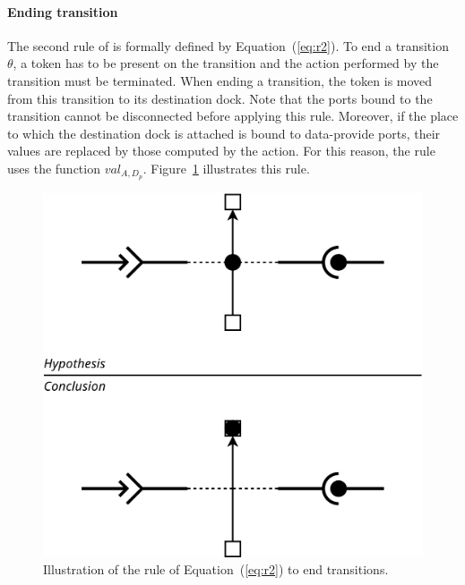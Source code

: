 \paragraph{Ending transition}{

The second rule of \mad is formally defined by
Equation~(\ref{eq:r2}). To end a transition $\theta$, a token has to
be present on the transition and the action performed by the
transition must be terminated. When ending a transition, the token
is moved from this transition to its destination dock. Note that the ports bound
to the transition cannot be disconnected before applying this rule. Moreover, if
the place to which the destination dock is attached is bound to
data-provide ports, their values are replaced by those computed by the action.
For this reason, the rule uses the function
$val_{A,D_p}$. Figure~\ref{fig:r2} illustrates this rule.

\begin{figure}[t]
\begin{center}
  \includegraphics[width=0.55\columnwidth]{./images/ending_transition.pdf}
\end{center}
\caption{Illustration of the rule of Equation~(\ref{eq:r2}) to end transitions.}
\label{fig:r2}
\end{figure}
  
}

